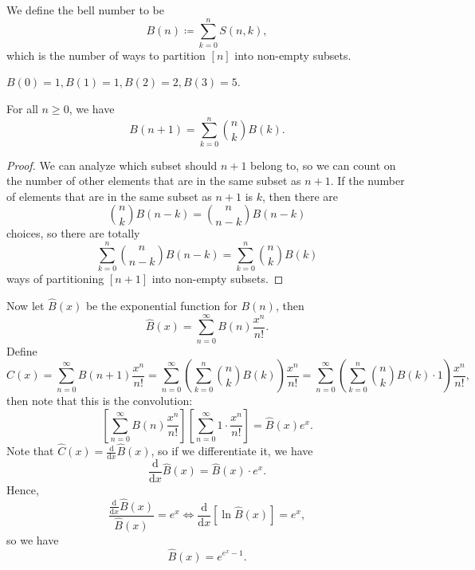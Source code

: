 \begin{definition}
     We define the bell number to be 
    \[
        B(n) \coloneqq \sum_{k=0}^n S(n, k), 
    \] which is the number of ways to partition \([n]\) into non-empty subsets. 
\end{definition}

\begin{eg}
    \(B(0) = 1, B(1) = 1, B(2) = 2, B(3) = 5\). 
\end{eg}

\begin{theorem}
    For all \(n \ge 0\), we have 
    \[
        B(n+1) = \sum_{k=0}^n \binom{n}{k} B(k). 
    \] 
\end{theorem}
\begin{proof}
    We can analyze which subset should \(n+1\) belong to, so we can count on the number of other elements that are in the same subset as \(n+1\). If the number of elements that are in the same subset as \(n+1\) is \(k\), then there are 
    \[
        \binom{n}{k} B(n-k) = \binom{n}{n-k} B(n-k)
    \] choices, so there are totally
    \[
        \sum_{k=0}^n \binom{n}{n-k} B(n-k) = \sum_{k=0}^n \binom{n}{k} B(k)  
    \] ways of partitioning \([n+1]\) into non-empty subsets. 
\end{proof}

Now let \(\hat{B}  (x)\) be the exponential function for \(B(n)\), then 
\[
    \hat{B} (x) = \sum_{n=0}^{\infty} B(n) \frac{x^n}{n!}. 
\]  
Define
\[
    \hat{C} (x) = \sum_{n=0}^{\infty} B(n+1) \frac{x^n}{n!} = \sum_{n=0}^{\infty} \left( \sum_{k=0}^n \binom{n}{k} B(k) \right)  \frac{x^n}{n!} = \sum_{n=0}^{\infty} \left( \sum_{k=0}^n \binom{n}{k} B(k) \cdot 1 \right)  \frac{x^n}{n!},  
\] then note that this is the convolution: 
\[
    \left[ \sum_{n=0}^{\infty} B(n) \frac{x^n}{n!}  \right] \left[ \sum_{n=0}^{\infty} 1 \cdot \frac{x^n}{n!}  \right] = \hat{B} (x) e^x.  
\]
Note that \(\hat{C} (x) = \frac{\mathrm{d}}{\mathrm{d}x} \hat{B} (x) \), so if we differentiate it, we have 
\[
    \frac{\mathrm{d}}{\mathrm{d}x} \hat{B} (x) = \hat{B} (x) \cdot e^x. 
\]
Hence, 
\[
    \frac{\frac{\mathrm{d}}{\mathrm{d}x} \hat{B} (x) }{\hat{B} (x)} = e^x \iff \frac{\mathrm{d}}{\mathrm{d}x} \left[ \ln \hat{B} (x) \right] = e^x,  
\] so we have 
\[
    \hat{B} (x) = e^{e^x - 1}.
\]
